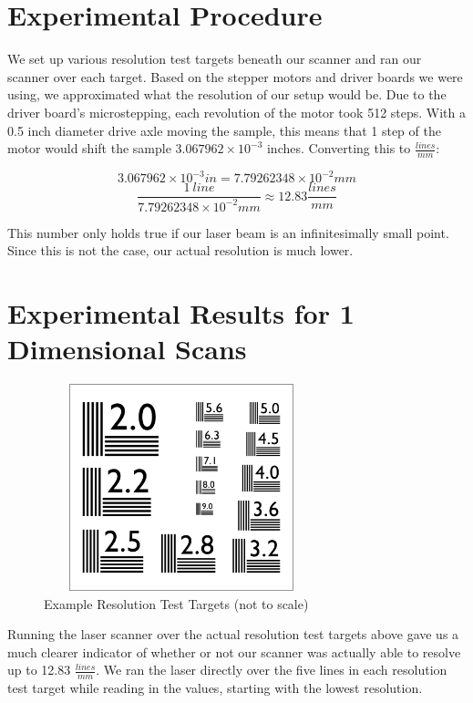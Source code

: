 \documentclass[letterpaper, 12pt]{article}
\begin{document}
\section{Experimental Procedure}
\par
We set up various resolution test targets beneath our scanner and ran our scanner over each target. Based on the stepper motors\footnotemark
{}
and driver boards\footnotemark
{}
we were using, we approximated what the resolution of our setup would be. Due to the driver board's microstepping, each revolution of the motor took 512 steps. With a 0.5 inch diameter drive axle moving the sample, this means that 1 step of the motor would shift the sample $3.067962\times10^{-3}$ inches. Converting this to $\frac{lines}{mm}$:

$$ 3.067962\times10^{-3}in = 7.79262348\times10^{-2}mm $$
$$ \frac{1\ line}{7.79262348\times10^{-2}mm} \approx 12.83\frac{lines}{mm} $$

\par
This number only holds true if our laser beam is an infinitesimally small point. Since this is not the case, our actual resolution is much lower.

\section{Experimental Results for 1 Dimensional Scans}

\begin{figure}[H]
  \centering
  \includegraphics[width=8cm,height=6cm]{resolution_test}
  \caption[caption]{Example Resolution Test Targets (not to scale)\cite{test_chart}}
\end{figure}

\par
Running the laser scanner over the actual resolution test targets above gave us a much clearer indicator of whether or not our scanner was actually able to resolve up to 12.83 $\frac{lines}{mm}$. We ran the laser directly over the five lines in each resolution test target while reading in the values, starting with the lowest resolution.
\end{document}
